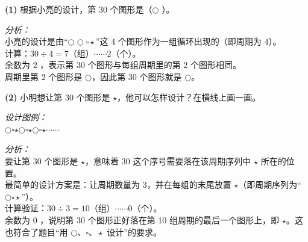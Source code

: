 {\small
\textbf{(1)} 根据小亮的设计，第 30 个图形是（\quad \textbf{$\bigcirc$} \quad）。

\vspace{0.3cm}
\textit{分析：}\\
小亮的设计是由“$\bigcirc \bigcirc \square \star$”这 4 个图形作为一组循环出现的（即周期为 $4$）。\\
计算：$30 \div 4 = 7$（组）$\cdots\cdots 2$（个）。\\
余数为 $2$ ，表示第 $30$ 个图形与每组周期里的第 $2$ 个图形相同。\\
周期里第 $2$ 个图形是 $\bigcirc$，因此第 $30$ 个图形就是 $\bigcirc$。

\vspace{0.8cm}
\textbf{(2)} 小明想让第 30 个图形是 $\star$，他可以怎样设计？在横线上画一画。

\vspace{0.3cm}
\textit{设计图例：}\\
\underline{\quad \Large $\bigcirc$\quad$\square$\quad$\star$\quad$\bigcirc$\quad$\square$\quad$\star$\quad$\bigcirc$\quad$\square$\quad$\star$\quad$\cdots\cdots$ \quad}

\vspace{0.6cm}
\textit{分析：}\\
要让第 $30$ 个图形是 $\star$，意味着 $30$ 这个序号需要落在该周期序列中 $\star$ 所在的位置。\\
最简单的设计方案是：让周期数量为 $3$，并在每组的末尾放置 $\star$（即周期序列为“$\bigcirc\square\star$”）。\\
计算验证：$30 \div 3 = 10$（组）$\cdots\cdots 0$（个）。\\
余数为 $0$ ，说明第 $30$ 个图形正好落在第 10 组周期的最后一个图形上，即 $\star$。这也符合了题目“用 $\bigcirc、\square、\star$ 设计”的要求。
}



